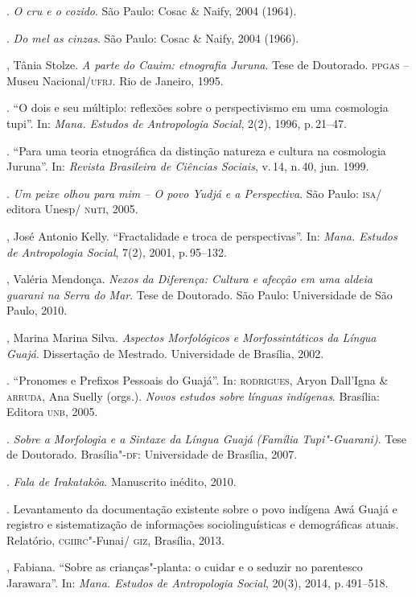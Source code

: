\begin{bibliohedra}
\titidem. \emph{O cru e o cozido}. São Paulo: Cosac \& Naify, 2004 (1964).

\titidem. \emph{Do mel as cinzas}. São Paulo: Cosac \& Naify, 2004 (1966).

, Tânia Stolze. \emph{A parte do Cauim: etnografia Juruna}. Tese de
Doutorado. \textsc{ppgas} -- Museu Nacional/\textsc{ufrj}. Rio de Janeiro, 1995.

\titidem. ``O dois e seu múltiplo: reflexões sobre o perspectivismo
em uma cosmologia tupi''. In: \emph{Mana. Estudos de Antropologia
Social}, 2(2), 1996, p.\,21--47.

\titidem. ``Para uma teoria etnográfica da distinção natureza e
cultura na cosmologia Juruna''. In: \emph{Revista Brasileira de Ciências
Sociais}, v.\,14, n.\,40, jun. 1999.

\titidem. \emph{Um peixe olhou para mim -- O povo Yudjá e a
Perspectiva}. São Paulo: \textsc{isa}/ editora Unesp/ \textsc{n}u\textsc{ti}, 2005.

, José Antonio Kelly. ``Fractalidade e troca de perspectivas''. In: \emph{Mana. Estudos de Antropologia Social}, 7(2), 2001, p.\,95--132.

, Valéria Mendonça. \emph{Nexos da Diferença: Cultura e afecção em uma aldeia
guarani na Serra do Mar}. Tese de Doutorado. São Paulo: Universidade de São Paulo, 2010.

, Marina Marina Silva. \emph{Aspectos Morfológicos e Morfossintáticos da Língua Guajá}. Dissertação de Mestrado. Universidade de Brasília, 2002.

\titidem. ``Pronomes e Prefixos Pessoais do Guajá''. In: \textsc{rodrigues},
Aryon Dall'Igna \& \textsc{arruda}, Ana Suelly (orgs.). \emph{Novos estudos
sobre línguas indígenas}. Brasília: Editora \textsc{unb}, 2005.

\titidem. \emph{Sobre a Morfologia e a Sintaxe da Língua Guajá
(Família Tupi"-Guarani)}. Tese de Doutorado. Brasília"-\textsc{df}: Universidade de
Brasília, 2007.

\titidem. \emph{Fala de Irakatakôa}. Manuscrito inédito, 2010.

\titidem. Levantamento da documentação existente sobre o povo
indígena Awá Guajá e registro e sistematização de informações
sociolinguísticas e demográficas atuais. Relatório, \textsc{cgiirc}"-Funai/ \textsc{giz},
Brasília, 2013.

, Fabiana. ``Sobre as crianças"-planta: o cuidar e o seduzir no
parentesco Jarawara''. In: \emph{Mana. Estudos de Antropologia Social}, 20(3), 2014, p.\,491--518.


\end{bibliohedra}
